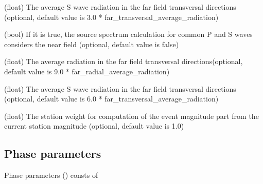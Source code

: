 \documentclass[letterpaper,10pt,english]{sphinxmanual}
\begin{document}
\begin{description}
\sphinxAtStartPar
(float)
The average S wave radiation in the far field transversal
directions (optional, default value is 3.0 * far\_transversal\_average\_radiation)

\sphinxAtStartPar
(bool)
If it is true,
the source spectrum calculation for common P and S waves considers the near field
(optional, default value is false)

\sphinxAtStartPar
(float)
The average radiation in the far field transversal
directions(optional, default value is 9.0 * far\_radial\_average\_radiation)

\sphinxAtStartPar
(float)
The average S wave radiation in the far field transversal
directions (optional, default value is \sphinxhyphen{}6.0 * far\_transversal\_average\_radiation)

\sphinxAtStartPar
(float)
The station weight for computation of the event magnitude part from the current station magnitude
(optional, default value is 1.0)

\end{description}


\subsection{Phase parameters}
\label{\detokenize{configuration:phase-parameters}}
\sphinxAtStartPar
Phase parameters () consts of
\end{document}
